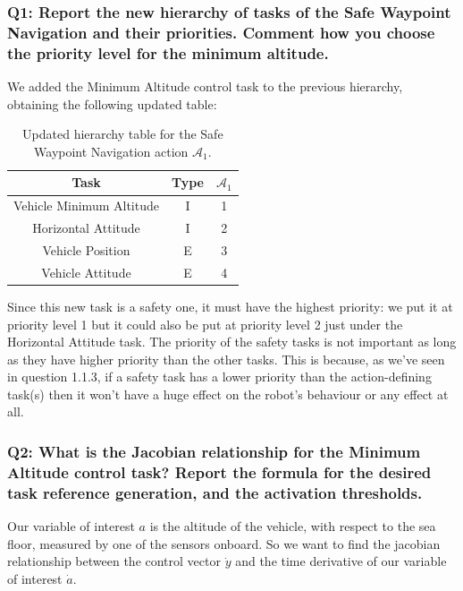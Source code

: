 \documentclass{article}
\begin{document}
\subsubsection{Q1: Report the new hierarchy of tasks of the Safe Waypoint Navigation and their priorities. Comment how you choose the priority level for the minimum altitude.}
We added the Minimum Altitude control task to the previous hierarchy, obtaining the following updated table:
\begin{table}[htb]
	\caption{Updated hierarchy table for the Safe Waypoint Navigation action $\mathcal{A}_{1}$.}
	\label{tb2:ex1.2.1SafeWaypointNavigationTable}
	\begin{center}
		\footnotesize
		\begin{tabular}{ccc}
			\toprule
			Task & Type & $\mathcal{A}_{1}$ \\
			\midrule
			Vehicle Minimum Altitude & I & 1 \\
			\hdashline
			Horizontal Attitude      & I & 2 \\
			\hdashline
			Vehicle Position 	     & E & 3 \\
			\hdashline
			Vehicle Attitude         & E & 4 \\
			\bottomrule
		\end{tabular}
	\end{center}
\end{table}

Since this new task is a safety one, it must have the highest priority: we put it at priority level 1 but it could also be put at priority level 2 just under the Horizontal Attitude task. The priority of the safety tasks is not important as long as they have higher priority than the other tasks. This is because, as we've seen in question 1.1.3, if a safety task has a lower priority than the action-defining task(s) then it won't have a huge effect on the robot's behaviour or any effect at all.


\subsubsection{Q2: What is the Jacobian relationship for the Minimum Altitude control task? Report the formula for the desired task reference generation, and the activation thresholds.}
Our variable of interest $ a $ is the altitude of the vehicle, with respect to the sea floor, measured by one of the sensors onboard. So we want to find the jacobian relationship between the control vector $ \dot{y} $ and the time derivative of our variable of interest $ \dot{a} $. \\
\end{document}
